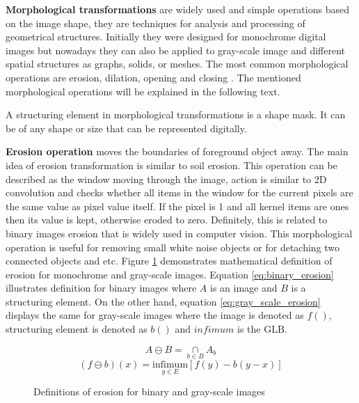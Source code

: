 \documentclass[../../../../main]{subfiles}
\begin{document}
\textbf{Morphological transformations} are widely used and simple operations based on the image shape, they are techniques for analysis and processing of geometrical structures. Initially they were designed for monochrome digital images but nowadays they can also be applied to gray-scale image and different spatial structures as graphs, solids, or meshes. The most common morphological operations are erosion, dilation, opening and closing \cite{morphology_website}. The mentioned morphological operations will be explained in the following text.

A structuring element in morphological transformations is a shape mask. It can be of any shape or size that can be represented digitally.

\textbf{Erosion operation} moves the boundaries of foreground object away. The main idea of erosion transformation is similar to soil erosion. This operation can be described as the window moving through the image, action is similar to 2D convolution and checks whether all items in the window for the current pixels are the same value as pixel value itself. If the pixel is 1 and all kernel items are ones then its value is kept, otherwise eroded to zero. Definitely, this is related to binary images erosion that is widely used in computer vision. This morphological operation is useful for removing small white noise objects or for detaching two connected objects and etc. Figure \ref{fig:erosion} demonstrates mathematical definition of erosion for monochrome and gray-scale images. Equation \ref{eq:binary_erosion} illustrates definition for binary images where $A$ is an image and $B$ is a structuring element. On the other hand, equation \ref{eq:gray_scale_erosion} displays the same for gray-scale images where the image is denoted as $f()$, structuring element is denoted as $b()$ and $infimum$ is the \ac{GLB}.

\begin{figure} [!ht]
  \centering    
    \begin{equation}
        A \ominus B = \underset{b\in B}{\cap} A_b
        \label{eq:binary_erosion}
    \end{equation}
    \begin{equation}
       (f \ominus b)(x) = \underset{y\in E}{\text{infimum}}[f(y)-b(y-x)]
       \label{eq:gray_scale_erosion}
    \end{equation}
  \label{fig:erosion}
  \caption{Definitions of erosion for binary and gray-scale images}
\end{figure}
\end{document}
